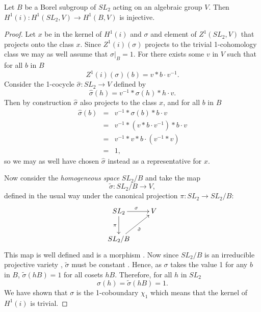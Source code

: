 \begin{lemma} Let $B$ be a Borel subgroup of $SL_2$ acting on an algebraic group $V$. Then $H^1(i):H^1(SL_2, V)\rightarrow H^1(B, V)$ is injective.
\end{lemma}
\begin{proof}
Let $x$ be in the kernel of $H^1(i)$ and $\sigma$ and element of $Z^1(SL_2, V)$ that projects onto the class $x$. Since $Z^1(i)(\sigma)$ projects to the trivial 1-cohomology class we may as well assume that $\sigma|_B = 1$. For there exists some $v$ in $V$ such that for all $b$ in $B$
\begin{displaymath}
	Z^1(i)(\sigma)(b) = v*b\cdot v^{-1}.
\end{displaymath}
Consider the 1-cocycle $\hat{\sigma}:SL_2\rightarrow V$ defined by
\begin{displaymath}
	\hat{\sigma}(h) = v^{-1}*\sigma(h)*h\cdot v.
\end{displaymath}
Then by construction $\hat{\sigma}$ also projects to the class $x$, and for all $b$ in $B$
\begin{eqnarray*}
	\hat{\sigma}(b) &=& v^{-1}*\sigma(b)*b\cdot v\\
	&=& v^{-1}*(v*b\cdot v^{-1})*b\cdot v\\
	&=& v^{-1}*v*b\cdot (v^{-1} * v)\\
	&=& 1,
\end{eqnarray*}
so we may as well have chosen $\hat{\sigma}$ instead as a representative for $x$. 

Now consider the \emph{homogeneous space} $SL_2/B$ \cite{humphreys1975linear} and take the map 
\begin{displaymath}
	\tilde{\sigma}:SL_2/B \rightarrow V,
\end{displaymath}
defined in the usual way under the canonical projection $\pi:SL_2 \rightarrow SL_2/B$:
\begin{displaymath}
	\xymatrix{
	SL_2 \ar[r]^{\sigma} \ar[d]_{\pi} & V\\
	SL_2/B \ar[ru]_{\tilde{\sigma}}
	}
\end{displaymath}
This map is well defined and is a morphism \cite{borel1991linear}. Now since $SL_2/B$ is an irreducible projective variety \cite{humphreys1975linear}, $\tilde{\sigma}$ must be constant  \cite{borel1991linear}. Hence, as $\sigma$ takes the value 1 for any $b$ in $B$, $\tilde{\sigma}(hB) = 1$ for all cosets $hB$. Therefore, for all $h$ in $SL_2$
\begin{displaymath}
	\sigma(h) = \tilde{\sigma}(hB) = 1.
\end{displaymath}
We have shown that $\sigma$ is the 1-coboundary $\chi_1$ which means that the kernel of $H^1(i)$ is trivial.
\end{proof} 


